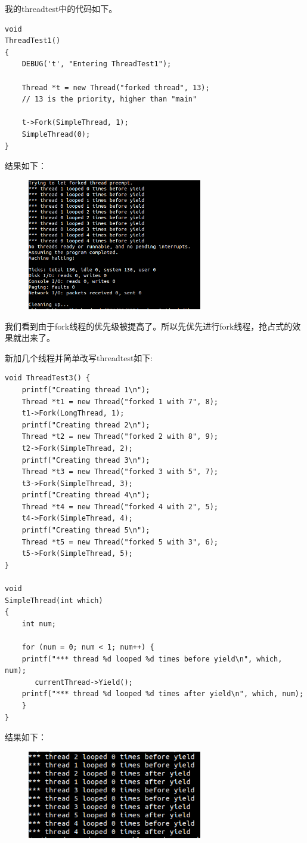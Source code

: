 \documentclass{ctexart}
\begin{document}
我的threadtest中的代码如下。
\begin{lstlisting}
void
ThreadTest1()
{
    DEBUG('t', "Entering ThreadTest1");

    Thread *t = new Thread("forked thread", 13); 
    // 13 is the priority, higher than "main"

    t->Fork(SimpleThread, 1);
    SimpleThread(0);
}
\end{lstlisting}
结果如下：
\begin{figure}[h]
 \centering
\includegraphics[width=3in]{ex22.png}
\end{figure}

我们看到由于fork线程的优先级被提高了。所以先优先进行fork线程，抢占式的效果就出来了。

新加几个线程并简单改写threadtest如下:
\begin{lstlisting}
void ThreadTest3() {
    printf("Creating thread 1\n");
    Thread *t1 = new Thread("forked 1 with 7", 8);
    t1->Fork(LongThread, 1);
    printf("Creating thread 2\n");
    Thread *t2 = new Thread("forked 2 with 8", 9);
    t2->Fork(SimpleThread, 2);
    printf("Creating thread 3\n");
    Thread *t3 = new Thread("forked 3 with 5", 7);
    t3->Fork(SimpleThread, 3);
    printf("Creating thread 4\n");
    Thread *t4 = new Thread("forked 4 with 2", 5);
    t4->Fork(SimpleThread, 4);
    printf("Creating thread 5\n");
    Thread *t5 = new Thread("forked 5 with 3", 6);
    t5->Fork(SimpleThread, 5);
}

void
SimpleThread(int which)
{
    int num;
    
    for (num = 0; num < 1; num++) {
	printf("*** thread %d looped %d times before yield\n", which, num);
       currentThread->Yield();
	printf("*** thread %d looped %d times after yield\n", which, num);
    }
}
\end{lstlisting}

结果如下：
\begin{figure}[h]
 \centering
\includegraphics[width=3in]{ex23.png}
\end{figure}
\end{document}
